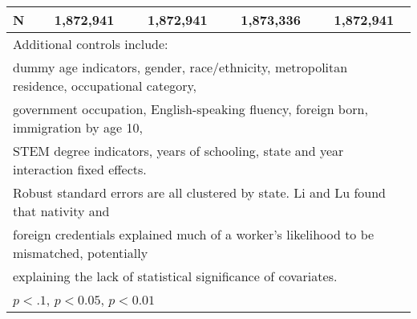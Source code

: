 \begin{table}[htbp]
\begin{tabular}{l*{4}{c}}
N                   &   1,872,941         &   1,872,941         &   1,873,336         &   1,872,941         \\
\bottomrule
\multicolumn{5}{l}{\footnotesize Additional controls include:}\\
\multicolumn{5}{l}{\footnotesize dummy age indicators, gender, race/ethnicity, metropolitan residence, occupational category,}\\
\multicolumn{5}{l}{\footnotesize government occupation, English-speaking fluency, foreign born, immigration by age 10,}\\
\multicolumn{5}{l}{\footnotesize STEM degree indicators, years of schooling, state and year interaction fixed effects.}\\
\multicolumn{5}{l}{\footnotesize Robust standard errors are all clustered by state. Li and Lu found that nativity and}\\
\multicolumn{5}{l}{\footnotesize foreign credentials explained much of a worker's likelihood to be mismatched, potentially}\\
\multicolumn{5}{l}{\footnotesize explaining the lack of statistical significance of covariates.}\\
\multicolumn{5}{l}{\footnotesize \sym{*} \(p<.1\), \sym{**} \(p<0.05\), \sym{***} \(p<0.01\)}\\
\end{tabular}
\end{table}
